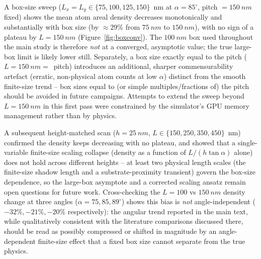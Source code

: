 \documentclass[aip,amsmath,amssymb,reprint]{revtex4-1}
\newcommand{\dang}{\ensuremath{\alpha}}
\begin{document}
A box-size sweep ($L_x=L_y \in \{75,100,125,150\}$~nm at $\dang=85^{\circ}$,
pitch $=\SI{150}{nm}$ fixed) shows the mean atom areal density decreases
monotonically and substantially with box size (by $\approx 29\%$ from
$\SI{75}{nm}$ to $\SI{150}{nm}$), with no sign of a plateau by
$L=\SI{150}{nm}$ (Figure~\ref{fig:boxconv}). The $\SI{100}{nm}$ box used throughout the main study is
therefore \emph{not} at a converged, asymptotic value; the true large-box
limit is likely lower still. Separately, a box size exactly equal to the
pitch ($L=\SI{150}{nm}=$~pitch) introduces an additional, sharper
commensurability artefact (erratic, non-physical atom counts at low
$\dang$) distinct from the smooth finite-size trend -- box sizes equal to
(or simple multiples/fractions of) the pitch should be avoided in future
campaigns. Attempts to extend the sweep beyond $L=\SI{150}{nm}$ in this
first pass were constrained by the simulator's GPU memory management
rather than by physics.

A subsequent height-matched scan ($h=\SI{25}{nm}$, $L\in\{150,250,350,450\}$~nm)
confirmed the density keeps decreasing with no plateau, and showed that a
single-variable finite-size scaling collapse (density as a function of
$L/(h\tan\dang)$ alone) does not hold across different heights -- at least
two physical length scales (the finite-size shadow length and a
substrate-proximity transient) govern the box-size dependence, so the
large-box asymptote and a corrected scaling ansatz remain open questions
for future work. Cross-checking the $L=100$ vs $\SI{150}{nm}$ density
change at three angles ($\dang=75,85,89^{\circ}$) shows this bias is
\emph{not} angle-independent ($-32\%,-21\%,-20\%$ respectively): the
angular trend reported in the main text, while qualitatively consistent
with the literature comparisons discussed there, should be read as
possibly compressed or shifted in magnitude by an angle-dependent
finite-size effect that a fixed box size cannot separate from the true
physics.
\end{document}
